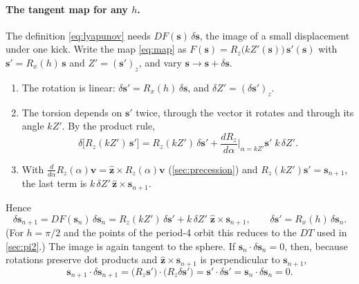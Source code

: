 \documentclass[11pt,a4paper]{article}
\newcommand{\vs}{\bm{s}}
\begin{document}
\paragraph{The tangent map for any $h$.} The definition \eqref{eq:lyapunov} needs $DF(\vs)\,\delta\vs$, the image of a
small displacement under one kick. Write the map \eqref{eq:map} as $F(\vs) = R_z\big(kZ'(\vs)\big)\,\vs'(\vs)$ with
$\vs' = R_x(h)\,\vs$ and $Z' = (\vs')_z$, and vary $\vs \to \vs + \delta\vs$.
\begin{enumerate}
  \item The rotation is linear: $\delta\vs' = R_x(h)\,\delta\vs$, and $\delta Z' = (\delta\vs')_z$.
  \item The torsion depends on $\vs'$ twice, through the vector it rotates and through its angle $kZ'$. By the
  product rule,
  \[ \delta\big[R_z(kZ')\,\vs'\big] = R_z(kZ')\,\delta\vs' + \frac{dR_z}{d\alpha}\Big|_{\alpha = kZ'}\vs'\;k\,\delta Z' . \]
  \item With $\frac{d}{d\alpha}R_z(\alpha)\bm v = \hat{\bm z}\times R_z(\alpha)\bm v$ (\cref{sec:precession}) and
  $R_z(kZ')\vs' = \vs_{n+1}$, the last term is $k\,\delta Z'\,\hat{\bm z}\times\vs_{n+1}$.
\end{enumerate}
Hence
\begin{equation}\label{eq:tangent}
  \boxed{\delta\vs_{n+1} = DF(\vs_n)\,\delta\vs_n = R_z(kZ')\,\delta\vs' + k\,\delta Z'\;\hat{\bm z}\times\vs_{n+1},
  \qquad \delta\vs' = R_x(h)\,\delta\vs_n .}
\end{equation}
(For $h = \pi/2$ and the points of the period-4 orbit this reduces to the $DT$ used in \cref{sec:pi2}.) The image is
again tangent to the sphere. If $\vs_n\cdot\delta\vs_n = 0$, then, because rotations preserve dot products and $\hat{\bm
z}\times\vs_{n+1}$ is perpendicular to $\vs_{n+1}$,
\begin{equation*}
  \vs_{n+1}\cdot\delta\vs_{n+1} = \big(R_z\vs'\big)\cdot\big(R_z\delta\vs'\big) = \vs'\cdot\delta\vs' = \vs_n\cdot\delta\vs_n = 0 .
\end{equation*}
\end{document}
